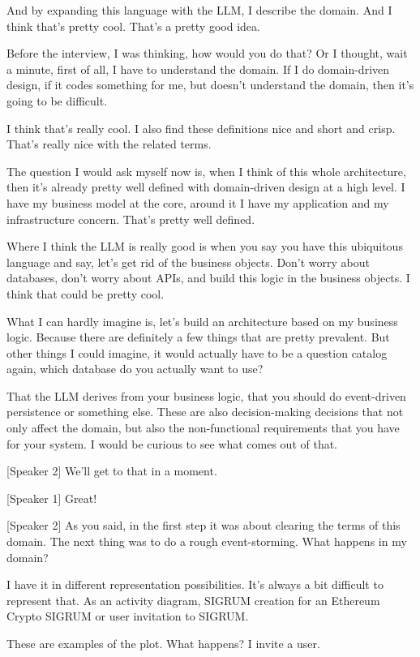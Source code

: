 And by expanding this language with the LLM, I describe the domain. And I think that's pretty cool. That's a pretty good idea.

Before the interview, I was thinking, how would you do that? Or I thought, wait a minute, first of all, I have to understand the domain. If I do domain-driven design, if it codes something for me, but doesn't understand the domain, then it's going to be difficult.

I think that's really cool. I also find these definitions nice and short and crisp. That's really nice with the related terms.

The question I would ask myself now is, when I think of this whole architecture, then it's already pretty well defined with domain-driven design at a high level. I have my business model at the core, around it I have my application and my infrastructure concern. That's pretty well defined.

Where I think the LLM is really good is when you say you have this ubiquitous language and say, let's get rid of the business objects. Don't worry about databases, don't worry about APIs, and build this logic in the business objects. I think that could be pretty cool.

What I can hardly imagine is, let's build an architecture based on my business logic. Because there are definitely a few things that are pretty prevalent. But other things I could imagine, it would actually have to be a question catalog again, which database do you actually want to use?

That the LLM derives from your business logic, that you should do event-driven persistence or something else. These are also decision-making decisions that not only affect the domain, but also the non-functional requirements that you have for your system. I would be curious to see what comes out of that.

[Speaker 2]
We'll get to that in a moment.

[Speaker 1]
Great!

[Speaker 2]
As you said, in the first step it was about clearing the terms of this domain. The next thing was to do a rough event-storming. What happens in my domain?

I have it in different representation possibilities. It's always a bit difficult to represent that. As an activity diagram, SIGRUM creation for an Ethereum Crypto SIGRUM or user invitation to SIGRUM.

These are examples of the plot. What happens? I invite a user.

